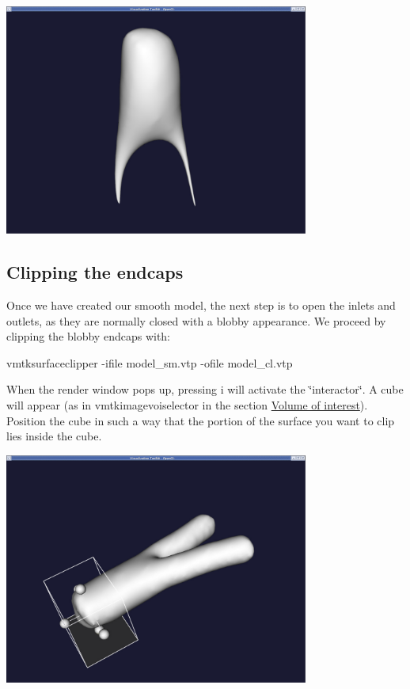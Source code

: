  
\begin{DoxyImageNoCaption}
  \mbox{\includegraphics[width=0.75\textwidth]{smooth0001100}}
\end{DoxyImageNoCaption}




 

\hypertarget{index_clip}{}\subsection{Clipping the endcaps}\label{index_clip}
Once we have created our smooth model, the next step is to open the inlets and outlets, as they are normally closed with a blobby appearance. We proceed by clipping the blobby endcaps with\+:


\begin{DoxyCode}
vmtksurfaceclipper -ifile model\_sm.vtp -ofile model\_cl.vtp
\end{DoxyCode}


When the render window pops up, pressing {\ttfamily i} will activate the \char`\"{}interactor\char`\"{}. A cube will appear (as in {\ttfamily vmtkimagevoiselector} in the section \hyperlink{index_voi}{Volume of interest}). Position the cube in such a way that the portion of the surface you want to clip lies inside the cube.

 
\begin{DoxyImageNoCaption}
  \mbox{\includegraphics[width=0.75\textwidth]{clip0}}
\end{DoxyImageNoCaption}


